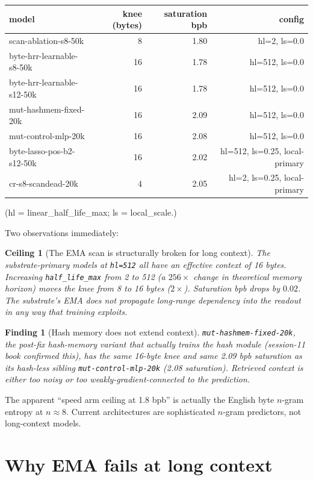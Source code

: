 \documentclass[11pt,openany]{book}
\newtheorem{finding}{Finding}[chapter]
\newtheorem{ceiling}{Ceiling}[chapter]
\begin{document}
\begin{longtable}{lrrr}
\toprule
model & knee (bytes) & saturation bpb & config \\
\midrule
scan-ablation-s8-50k        & 8    & 1.80 & hl=2,   ls=0.0 \\
byte-hrr-learnable-s8-50k   & 16   & 1.78 & hl=512, ls=0.0 \\
byte-hrr-learnable-s12-50k  & 16   & 1.78 & hl=512, ls=0.0 \\
mut-hashmem-fixed-20k       & 16   & 2.09 & hl=512, ls=0.0 \\
mut-control-mlp-20k         & 16   & 2.08 & hl=512, ls=0.0 \\
\midrule
byte-lasso-pos-b2-s12-50k   & 16   & 2.02 & hl=512, ls=0.25, local-primary \\
cr-s8-scandead-20k          & 4    & 2.05 & hl=2,   ls=0.25, local-primary \\
\bottomrule
\end{longtable}

(hl = linear\_half\_life\_max; ls = local\_scale.)

Two observations immediately:

\begin{ceiling}[The EMA scan is structurally broken for long context]
The substrate-primary models at \texttt{hl=512} all have an effective
context of 16 bytes. Increasing \texttt{half\_life\_max} from 2 to 512
(a $256\times$ change in theoretical memory horizon) moves the knee from
8 to 16 bytes ($2\times$). Saturation bpb drops by $0.02$. The
substrate's EMA does not propagate long-range dependency into the readout
in any way that training exploits.
\end{ceiling}

\begin{finding}[Hash memory does not extend context]
\texttt{mut-hashmem-fixed-20k}, the post-fix hash-memory variant that
actually trains the hash module (session-11 book confirmed this), has the
same 16-byte knee and same 2.09 bpb saturation as its hash-less sibling
\texttt{mut-control-mlp-20k} (2.08 saturation). Retrieved context is either
too noisy or too weakly-gradient-connected to the prediction.
\end{finding}

The apparent ``speed arm ceiling at 1.8 bpb'' is actually the English byte
$n$-gram entropy at $n\approx 8$. Current architectures are sophisticated
$n$-gram predictors, not long-context models.

\section{Why EMA fails at long context}
\end{document}
